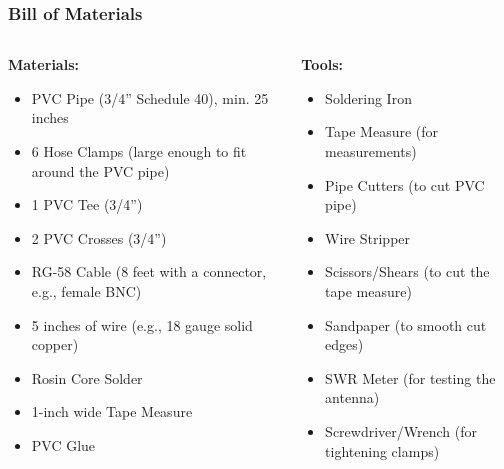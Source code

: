 \documentclass{beamer}
\begin{document}
\begin{frame}
    \frametitle{Bill of Materials}
    \scriptsize %
    \begin{columns}
        \begin{column}{0.5\textwidth}
            \textbf{Materials:}
            \begin{itemize}
                \item PVC Pipe (3/4” Schedule 40), min. 25 inches
                \item 6 Hose Clamps (large enough to fit around the PVC pipe)
                \item 1 PVC Tee (3/4”)
                \item 2 PVC Crosses (3/4”)
                \item RG-58 Cable (8 feet with a connector, e.g., female BNC)
                \item 5 inches of wire (e.g., 18 gauge solid copper)
                \item Rosin Core Solder
                \item 1-inch wide Tape Measure
                \item PVC Glue
            \end{itemize}
        \end{column}
        
        \begin{column}{0.5\textwidth}
            \textbf{Tools:}
            \begin{itemize}
                \item Soldering Iron
                \item Tape Measure (for measurements)
                \item Pipe Cutters (to cut PVC pipe)
                \item Wire Stripper
                \item Scissors/Shears (to cut the tape measure)
                \item Sandpaper (to smooth cut edges)
                \item SWR Meter (for testing the antenna)
                \item Screwdriver/Wrench (for tightening clamps)
            \end{itemize}
        \end{column}
    \end{columns}
\end{frame}
\end{document}
